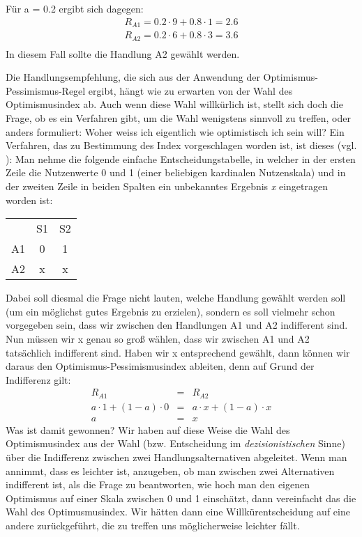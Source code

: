 Für a = 0.2 ergibt sich dagegen:
\begin{eqnarray*}
& R_{A1} = 0.2 \cdot 9 + 0.8 \cdot 1 = 2.6 & \\
& R_{A2} = 0.2 \cdot 6 + 0.8 \cdot 3 = 3.6 & \\
\end{eqnarray*}
In diesem Fall sollte die Handlung A2 gewählt werden.

Die Handlungsempfehlung, die sich aus der Anwendung
der Optimismus-Pessimismus-Regel ergibt, hängt wie zu erwarten von der Wahl des
Optimismusindex ab. Auch wenn diese Wahl willkürlich ist, stellt sich doch die
Frage, ob es ein Verfahren gibt, um die Wahl wenigstens sinnvoll zu treffen,
oder anders formuliert: Woher weiss ich eigentlich wie optimistisch ich sein
will? Ein Verfahren, das zu Bestimmung des Index vorgeschlagen worden ist, ist
dieses (vgl. \cite[S. 33]{resnik:1987}): 
 Man nehme die folgende 
einfache Entscheidungstabelle, in welcher in der ersten Zeile die Nutzenwerte 0
und 1 (einer beliebigen kardinalen Nutzenskala) und in der zweiten Zeile in beiden
Spalten ein unbekanntes Ergebnis {\em x} eingetragen worden ist:
\begin{center}
\begin{tabular}{c|c|c|}
\multicolumn{1}{c}{}  & \multicolumn{1}{c}{S1}  & \multicolumn{1}{c}{S2} 
\\ \cline{2-3}
 A1 & 0 & 1 \\ \cline{2-3}
 A2 & x & x \\ \cline{2-3}
\end{tabular}
\end{center}
Dabei soll diesmal die Frage nicht lauten, welche Handlung gewählt werden soll
(um ein möglichst gutes Ergebnis zu erzielen), sondern es soll vielmehr schon
vorgegeben sein, dass wir zwischen den Handlungen A1 und A2 indifferent sind.
Nun müssen wir x genau so groß wählen, dass wir zwischen A1 und A2 tatsächlich
indifferent sind. Haben wir x entsprechend gewählt, dann können wir daraus den
Optimismus-Pessimismusindex ableiten, denn auf Grund der Indifferenz gilt:
\begin{eqnarray*}
R_{A1} & = & R_{A2} \\
a \cdot 1 + (1-a) \cdot 0 & = & a \cdot x + (1-a) \cdot x \\
a & = & x
\end{eqnarray*}
Was ist damit gewonnen? Wir haben auf diese Weise die Wahl des Optimismusindex
aus der Wahl (bzw. Entscheidung im {\em dezisionistischen} Sinne) über die
Indifferenz zwischen zwei Handlungsalternativen abgeleitet. Wenn man annimmt,
dass es leichter ist, anzugeben, ob man zwischen zwei Alternativen indifferent
ist, als die Frage zu beantworten, wie hoch man den eigenen Optimismus auf
einer Skala zwischen 0 und 1 einschätzt, dann vereinfacht das die Wahl des
Optimusmusindex. Wir hätten dann eine Willkürentscheidung auf eine andere
zurückgeführt, die zu treffen uns möglicherweise leichter fällt.

